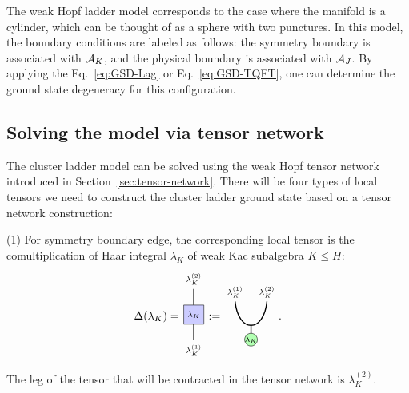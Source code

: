 \documentclass[a4paper,11pt]{article}
\theoremstyle{theorem}
\theoremstyle{remark}
\newcommand{\cone}{(1)}
\newcommand{\ctwo}{(2)}
\newcommand{\cA}{\text{\usefont{OMS}{cmsy}{m}{n}A}}
\begin{document}
The weak Hopf ladder model corresponds to the case where the manifold is a cylinder, which can be thought of as a sphere with two punctures. In this model, the boundary conditions are labeled as follows: the symmetry boundary is associated with $\cA_K$, and the physical boundary is associated with $\cA_J$. By applying the Eq.~\eqref{eq:GSD-Lag} or Eq.~\eqref{eq:GSD-TQFT}, one can determine the ground state degeneracy for this configuration.

\subsection{Solving the model via tensor network}

The cluster ladder model can be solved using the weak Hopf tensor network introduced in Section~\ref{sec:tensor-network}.
There will be four types of local tensors we need to construct the cluster ladder ground state based on a tensor network construction:

(1) For symmetry boundary edge, the corresponding local tensor is the comultiplication of Haar integral $\lambda_K$ of weak Kac subalgebra $K\leq H$:
\begin{equation}
     \Delta(\lambda_K)= \begin{aligned}			
\begin{tikzpicture}
    \node[draw, fill=blue!20, minimum width=0.6cm, minimum height=0.6cm] (center) at (0,0) {$\scriptstyle\lambda_K$};
    \draw[line width=1.0pt] (center.north) -- ++(0,.5) node[above] {$\scriptstyle\lambda_K^{\ctwo}$};
    \draw[line width=1.0pt ] (center.south) -- ++(0,-.5) node[below] {$\scriptstyle \lambda_K^{\cone}$};
\end{tikzpicture}
\end{aligned} :=  \begin{aligned}
				\begin{tikzpicture}
					\draw[black, line width=1.0pt]  (-0.5, 1) .. controls (-0.4, 0) and (0.4, 0) .. (0.5, 1);
					\draw[black, line width=1.0pt]  (0,0.23)--(0,-0.23);
        \filldraw[green!30, draw=black] 
       (0,-0.2) circle (0.2);
    \node at (0, -0.2) {\textcolor{black}{$\scriptstyle \lambda_K$}};
                   \node at (-0.5, 1.3) {$\scriptstyle \lambda_K^{\cone}$};
	                   \node at (0.5, 1.3) {$\scriptstyle \lambda_K^{\ctwo}$};			
    \end{tikzpicture}
\end{aligned}.
\end{equation}
The leg of the tensor that will be contracted in the tensor network  is \( \lambda_K^{\ctwo} \).
\end{document}
